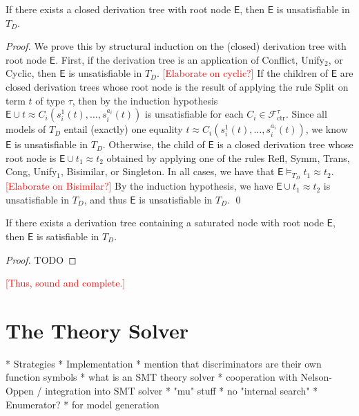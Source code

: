 \documentclass[a4paper,oribibl,envcountsame,draft]{llncs}
\newcommand{\Ec}{\mathsf{E}}
\newcommand{\rn}[1]{\textsf{\small #1}}
\newcommand{\teq}{\approx}
\newcommand{\rem}[1]{\textcolor{red}{[#1]}}
\newcommand{\thD}{T_{D}}
\newcommand\Funcs{\mathcal{F}}
\newcommand\Ctr{\Funcs_{\mathrm{ctr}}}
\begin{document}
\begin{lemma}
If there exists a closed derivation tree with root node $\Ec$, then $\Ec$ is unsatisfiable in $\thD$.
\end{lemma}
\begin{proof}
We prove this by structural induction on the (closed) derivation tree with root node $\Ec$.
First, if the derivation tree is an application of \rn{Conflict}, \rn{Unify$_2$}, or \rn{Cyclic},
then $\Ec$ is unsatisfiable in $\thD$.
\rem{Elaborate on cyclic?}
If the children of $\Ec$ are closed derivation trees 
whose root node is the result of applying the rule \rn{Split} on term $t$ of type $\tau$,
then by the induction hypothesis $\Ec \cup t \teq C_i( s^1_i( t ), \ldots, s^{a_i}_i( t ) )$ is unsatisfiable
for each $C_i \in \Ctr^\tau$.
Since all models of $\thD$ entail (exactly) one equality $t \teq C_i( s^1_i( t ), \ldots, s^{a_i}_i( t ) )$,
we know $\Ec$ is unsatisfiable in $\thD$.
Otherwise, the child of $\Ec$ is a closed derivation tree 
whose root node is $\Ec \cup t_1 \teq t_2$ obtained by applying one of the rules \rn{Refl}, \rn{Symm}, \rn{Trans}, \rn{Cong}, \rn{Unify$_1$}, \rn{Bisimilar}, or \rn{Singleton}.
In all cases, we have that $\Ec \models_{\thD} t_1 \teq t_2$.
\rem{Elaborate on Bisimilar?}
By the induction hypothesis, we have $\Ec \cup t_1 \teq t_2$ is unsatisfiable in $\thD$, 
and thus $\Ec$ is unsatisfiable in $\thD$.
\qed
\end{proof}

\begin{lemma}
If there exists a derivation tree containing a saturated node with root node $\Ec$, then $\Ec$ is satisfiable in $\thD$.
\end{lemma}
\begin{proof}
TODO
\end{proof}

\rem{Thus, sound and complete.}
  
\section{The Theory Solver}
\label{sec:the-theory-solver}

  * Strategies
  * Implementation
    * mention that discriminators are their own function symbols
    * what is an SMT theory solver
    * cooperation with Nelson-Oppen / integration into SMT solver
    * "mu" stuff
    * no "internal search"
  * Enumerator?
    * for model generation

\end{document}
